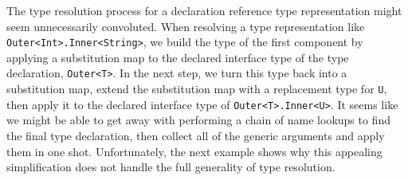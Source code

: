\documentclass[a4paper,headsepline,bibliography=totoc,toc=flat,fleqn,twoside=semi]{scrbook}
\theoremstyle{definition}
\theoremstyle{definition}
\theoremstyle{definition}
\begin{document}
The type resolution process for a declaration reference type representation might seem unnecessarily convoluted. When resolving a type representation like \texttt{Outer<Int>.Inner<String>}, we build the type of the first component by applying a substitution map to the declared interface type of the type declaration, \texttt{Outer<T>}. In the next step, we turn this type back into a substitution map, extend the substitution map with a replacement type for \texttt{U}, then apply it to the declared interface type of \texttt{Outer<T>.Inner<U>}. It seems like we might be able to get away with performing a chain of name lookups to find the final type declaration, then collect all of the generic arguments and apply them in one shot. Unfortunately, the next example shows why this appealing simplification does not handle the full generality of type resolution.
\end{document}
